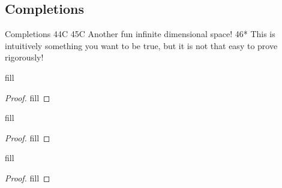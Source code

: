 \subsection{Completions}

Completions
44C
45C Another fun infinite dimensional space!
46* This is intuitively something you want to be true, but it is not that easy to prove rigorously!

\begin{exercise}{44}
fill
\end{exercise}
\begin{proof}
fill
\end{proof} 

\begin{exercise}{45}
fill
\end{exercise}
\begin{proof}
fill
\end{proof} 

\begin{exercise}{46}
fill
\end{exercise}
\begin{proof}
fill
\end{proof} 
